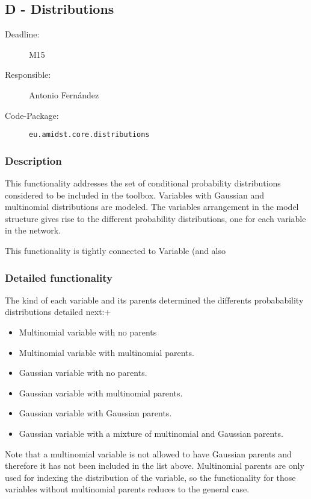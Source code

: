 \subsection{D - Distributions}
\label{Distributions:D}

\begin{description}
\item[Deadline:] M15
\item[Responsible:] Antonio Fern\'andez
\item[Code-Package:] \texttt{eu.amidst.core.distributions}
\end{description}

\subsubsection*{Description}

This functionality addresses the set of conditional probability distributions considered to be included in the toolbox. Variables with Gaussian and multinomial distributions are modeled. The variables arrangement in the model structure gives rise to the different probability distributions, one for each variable in the network. 

This functionality is tightly connected to Variable (and also



\subsubsection*{Detailed functionality}

The kind of each variable and its parents determined the differents probabability distributions detailed next:+

\begin{itemize}
\item Multinomial variable with no parents
\item Multinomial variable with multinomial parents.
\item Gaussian variable with no parents.
\item Gaussian variable with multinomial parents.
\item Gaussian variable with Gaussian parents. 
\item Gaussian variable with a mixture of multinomial and Gaussian parents. 

\end{itemize}

Note that a multinomial variable is not allowed to have Gaussian parents and therefore it has not been included in the list above.
Multinomial parents are only used for indexing the distribution of the variable, so the functionality for those variables without multinomial parents reduces to the general case.


